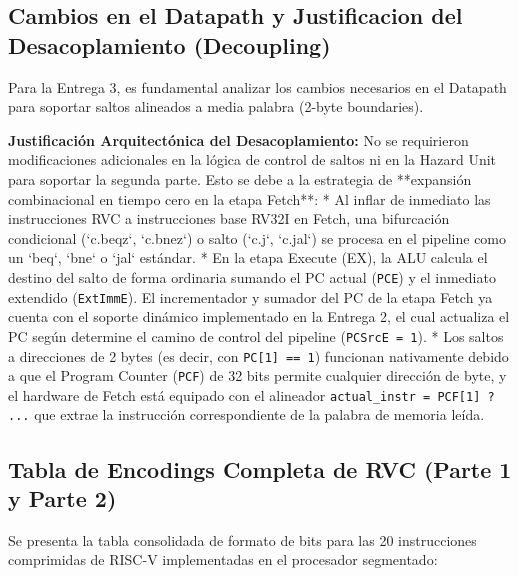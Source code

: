 \documentclass[12pt, a4paper]{article}
\begin{document}
\subsection{Cambios en el Datapath y Justificacion del Desacoplamiento (Decoupling)}
Para la Entrega 3, es fundamental analizar los cambios necesarios en el Datapath para soportar saltos alineados a media palabra (2-byte boundaries).

\textbf{Justificación Arquitectónica del Desacoplamiento:}
No se requirieron modificaciones adicionales en la lógica de control de saltos ni en la Hazard Unit para soportar la segunda parte. Esto se debe a la estrategia de **expansión combinacional en tiempo cero en la etapa Fetch**:
*   Al inflar de inmediato las instrucciones RVC a instrucciones base RV32I en Fetch, una bifurcación condicional (`c.beqz`, `c.bnez`) o salto (`c.j`, `c.jal`) se procesa en el pipeline como un `beq`, `bne` o `jal` estándar.
*   En la etapa Execute (EX), la ALU calcula el destino del salto de forma ordinaria sumando el PC actual (\texttt{PCE}) y el inmediato extendido (\texttt{ExtImmE}). El incrementador y sumador del PC de la etapa Fetch ya cuenta con el soporte dinámico implementado en la Entrega 2, el cual actualiza el PC según determine el camino de control del pipeline (\texttt{PCSrcE = 1}).
*   Los saltos a direcciones de 2 bytes (es decir, con \texttt{PC[1] == 1}) funcionan nativamente debido a que el Program Counter (\texttt{PCF}) de 32 bits permite cualquier dirección de byte, y el hardware de Fetch está equipado con el alineador \texttt{actual\_instr = PCF[1] ? ...} que extrae la instrucción correspondiente de la palabra de memoria leída.

\subsection{Tabla de Encodings Completa de RVC (Parte 1 y Parte 2)}
Se presenta la tabla consolidada de formato de bits para las 20 instrucciones comprimidas de RISC-V implementadas en el procesador segmentado:
\end{document}
